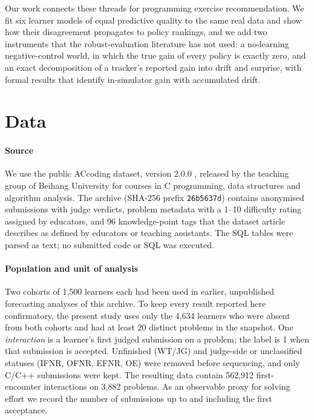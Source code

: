 \documentclass[a4paper,preprint,12pt,authoryear]{elsarticle}
\begin{document}
Our work connects these threads for programming exercise recommendation. We fit six learner models of equal predictive quality to the same real data and show how their disagreement propagates to policy rankings, and we add two instruments that the robust-evaluation literature has not used: a no-learning negative-control world, in which the true gain of every policy is exactly zero, and an exact decomposition of a tracker's reported gain into drift and surprise, with formal results that identify in-simulator gain with accumulated drift.

\section{Data}\label{sec:data}

\paragraph{Source} We use the public ACcoding dataset, version 2.0.0 \citep{chen2024accoding,sun2026accodingdata}, released by the teaching group of Beihang University for courses in C programming, data structures and algorithm analysis. The archive (SHA-256 prefix \texttt{26b5637d}) contains anonymised submissions with judge verdicts, problem metadata with a 1--10 difficulty rating assigned by educators, and 96 knowledge-point tags that the dataset article describes as defined by educators or teaching assistants. The SQL tables were parsed as text; no submitted code or SQL was executed.

\paragraph{Population and unit of analysis} Two cohorts of 1,500 learners each had been used in earlier, unpublished forecasting analyses of this archive. To keep every result reported here confirmatory, the present study uses only the 4,634 learners who were absent from both cohorts and had at least 20 distinct problems in the snapshot. One \emph{interaction} is a learner's first judged submission on a problem; the label is 1 when that submission is accepted. Unfinished (WT/JG) and judge-side or unclassified statuses (IFNR, OFNR, EFNR, OE) were removed before sequencing, and only C/C++ submissions were kept. The resulting data contain 562,912 first-encounter interactions on 3,882 problems. As an observable proxy for solving effort we record the number of submissions up to and including the first acceptance.
\end{document}
